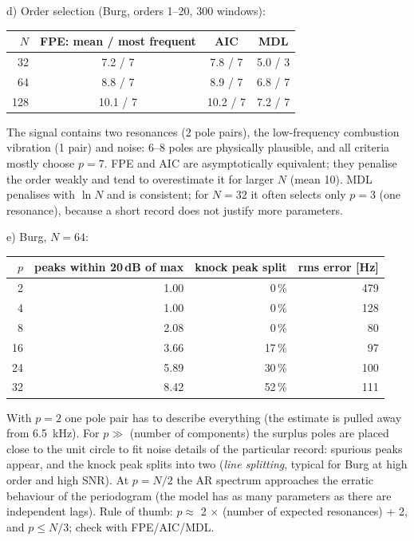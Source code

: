 \begin{solution}
d) Order selection (Burg, orders 1--20, 300 windows):
\begin{center}
\small
\begin{tabular}{@{}rccc@{}}
\toprule
$N$ & FPE: mean / most frequent & AIC & MDL\\
\midrule
32 & 7.2 / 7 & 7.8 / 7 & 5.0 / 3\\
64 & 8.8 / 7 & 8.9 / 7 & 6.8 / 7\\
128 & 10.1 / 7 & 10.2 / 7 & 7.2 / 7\\
\bottomrule
\end{tabular}
\end{center}
The signal contains two resonances (2 pole pairs), the low-frequency combustion
vibration (1 pair) and noise: 6--8 poles are physically plausible, and all criteria
mostly choose $p=7$. FPE and AIC are asymptotically equivalent; they penalise the
order weakly and tend to overestimate it for larger $N$ (mean 10). MDL penalises with
$\ln N$ and is consistent; for $N=32$ it often selects only $p=3$ (one resonance),
because a short record does not justify more parameters.

e) Burg, $N=64$:
\begin{center}
\small
\begin{tabular}{@{}rrrr@{}}
\toprule
$p$ & peaks within 20\,dB of max & knock peak split & rms error [Hz]\\
\midrule
2 & 1.00 & 0\,\% & 479\\
4 & 1.00 & 0\,\% & 128\\
8 & 2.08 & 0\,\% & 80\\
16 & 3.66 & 17\,\% & 97\\
24 & 5.89 & 30\,\% & 100\\
32 & 8.42 & 52\,\% & 111\\
\bottomrule
\end{tabular}
\end{center}
With $p=2$ one pole pair has to describe everything (the estimate is pulled away from
\SI{6.5}{kHz}). For $p\gg$ (number of components) the surplus poles are placed close to
the unit circle to fit noise details of the particular record: spurious peaks appear,
and the knock peak splits into two (\emph{line splitting}, typical for Burg at high
order and high SNR). At $p=N/2$ the AR spectrum approaches the erratic behaviour of the
periodogram (the model has as many parameters as there are independent lags). Rule
of thumb: $p\approx$ 2 $\times$ (number of expected resonances) + 2, and $p\le N/3$; check
with FPE/AIC/MDL.
\end{solution}

